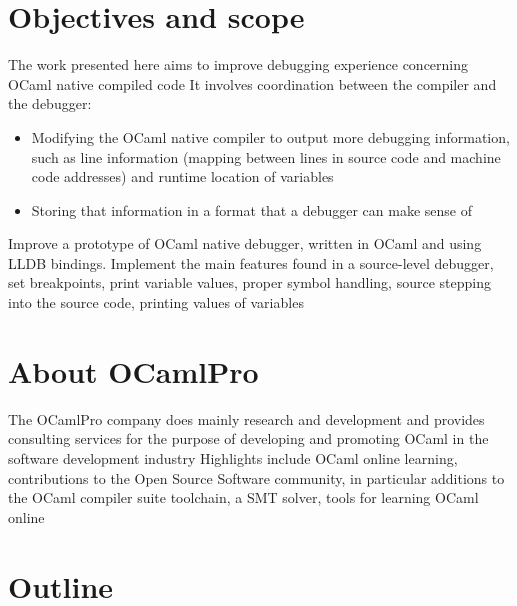 \section{Objectives and scope\label{sec:objective}}

The work presented here aims to improve debugging experience concerning OCaml native compiled code
It involves coordination between the compiler and the debugger:

\begin{itemize}
    \item Modifying the OCaml native compiler to output more debugging information, such as line information (mapping between lines in source code and machine code addresses) and runtime location of variables
    \item Storing that information in a format that a debugger can make sense of
\end{itemize}

Improve a prototype of OCaml native debugger, written in OCaml and using LLDB bindings.
Implement the main features found in a source-level debugger,
set breakpoints, print variable values, proper symbol handling, source stepping into the source code, printing values of variables

\section{About OCamlPro\label{sec:scope}}

The OCamlPro company does mainly research and development and provides consulting services for the purpose of developing and promoting OCaml in the software development industry
Highlights include OCaml online learning, contributions to the Open Source Software community, in particular additions to
the OCaml compiler suite toolchain, a SMT solver, tools for learning OCaml online


\section{Outline\label{sec:outline}}

